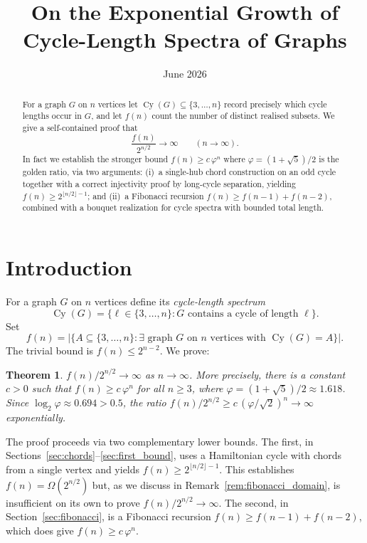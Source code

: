 \documentclass[11pt]{amsart}
\title{On the Exponential Growth of Cycle-Length Spectra of Graphs}
\author{}
\date{June 2026}
\newtheorem{theorem}{Theorem}[section]
\DeclareMathOperator{\Cy}{Cy}
\begin{document}
\maketitle

\begin{abstract}
For a graph $G$ on $n$ vertices let $\Cy(G)\subseteq\{3,\ldots,n\}$ record precisely which
cycle lengths occur in $G$, and let $f(n)$ count the number of distinct realised
subsets.  We give a self-contained proof that
\[
  \frac{f(n)}{2^{n/2}}\longrightarrow\infty \qquad (n\to\infty).
\]
In fact we establish the stronger bound $f(n)\ge c\,\varphi^{n}$ where
$\varphi=(1+\sqrt{5})/2$ is the golden ratio, via two arguments:
(i)~a single-hub chord construction on an odd cycle together with a correct
injectivity proof by long-cycle separation, yielding $f(n)\ge 2^{\lfloor n/2\rfloor-1}$;
and (ii)~a Fibonacci recursion $f(n)\ge f(n-1)+f(n-2)$, combined with a bouquet
realization for cycle spectra with bounded total length.
\end{abstract}

\section{Introduction}

For a graph $G$ on $n$ vertices define its \emph{cycle-length spectrum}
\[
  \Cy(G)=\{\ell\in\{3,\ldots,n\} : G \text{ contains a cycle of length }\ell\}.
\]
Set
\[
  f(n)=\bigl|\{A\subseteq\{3,\ldots,n\}: \exists\text{ graph }G\text{ on }n\text{ vertices
       with }\Cy(G)=A\}\bigr|.
\]
The trivial bound is $f(n)\le 2^{n-2}$.  We prove:

\begin{theorem}\label{thm:main}
$f(n)/2^{n/2}\to\infty$ as $n\to\infty$.  More precisely, there is a constant $c>0$
such that $f(n)\ge c\,\varphi^{n}$ for all $n\ge 3$, where
$\varphi=(1+\sqrt{5})/2\approx 1.618$.  Since $\log_2\varphi\approx 0.694>0.5$, the
ratio $f(n)/2^{n/2}\ge c\,(\varphi/\sqrt{2})^{n}\to\infty$ exponentially.
\end{theorem}

The proof proceeds via two complementary lower bounds.  The first, in
Sections~\ref{sec:chords}--\ref{sec:first_bound}, uses a Hamiltonian cycle with
chords from a single vertex and yields $f(n)\ge 2^{\lfloor n/2\rfloor-1}$.  This
establishes $f(n)=\Omega(2^{n/2})$ but, as we discuss in
Remark~\ref{rem:fibonacci_domain}, is insufficient on its own to prove $f(n)/2^{n/2}
\to\infty$.  The second, in Section~\ref{sec:fibonacci}, is a Fibonacci recursion
$f(n)\ge f(n-1)+f(n-2)$, which does give $f(n)\ge c\,\varphi^{n}$.
\end{document}
